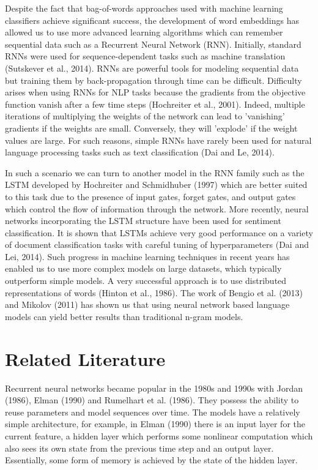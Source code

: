 \documentclass[conference]{IEEEtran}
\begin{document}
Despite the fact that bag-of-words approaches used with machine learning classifiers achieve significant success, the development of word embeddings has allowed us to use more advanced learning algorithms which can remember sequential data such as a Recurrent Neural Network (RNN). Initially, standard RNNs were used for sequence-dependent tasks such as machine translation (Sutskever et al., 2014). RNNs are powerful tools for modeling sequential data but training them by back-propagation through time  can be difficult. Difficulty arises when using RNNs for NLP tasks because the gradients from the objective function vanish after a few time steps (Hochreiter et al., 2001). Indeed, multiple iterations of multiplying the weights of the network can lead to 'vanishing' gradients if the weights are small. Conversely, they will 'explode' if the weight values are large. For such reasons, simple RNNs have rarely been used for natural language processing tasks such as text classification (Dai and Le, 2014). 

In such a scenario we can turn to another model in the RNN family such as the LSTM developed by Hochreiter and Schmidhuber (1997) which are better suited to this task due to the presence  of input gates, forget gates, and output gates which control the flow of information through the network. More recently, neural networks incorporating the LSTM structure have been used for sentiment classification. It is shown that LSTMs achieve very good performance on a variety of document classification tasks with careful tuning of hyperparameters (Dai and Lei, 2014). Such progress in machine learning techniques in recent years has enabled us to use more complex models on large datasets, which typically outperform simple models. A very successful approach is to use distributed representations of words (Hinton et al., 1986). The work of Bengio et al. (2013) and Mikolov (2011) has shown us that using neural network based language models can yield better results than traditional n-gram models.  

\section{Related Literature}

Recurrent neural networks became popular in the 1980s and 1990s with Jordan (1986), Elman (1990) and Rumelhart et al. (1986). They possess the ability to reuse parameters and model sequences over time. The models have a relatively simple architecture, for example, in Elman (1990) there is an input layer for the current feature, a hidden layer which performs some nonlinear computation which also sees its own state from the previous time step and an output layer. Essentially, some form of memory is achieved by the state of the hidden layer. 
\end{document}
